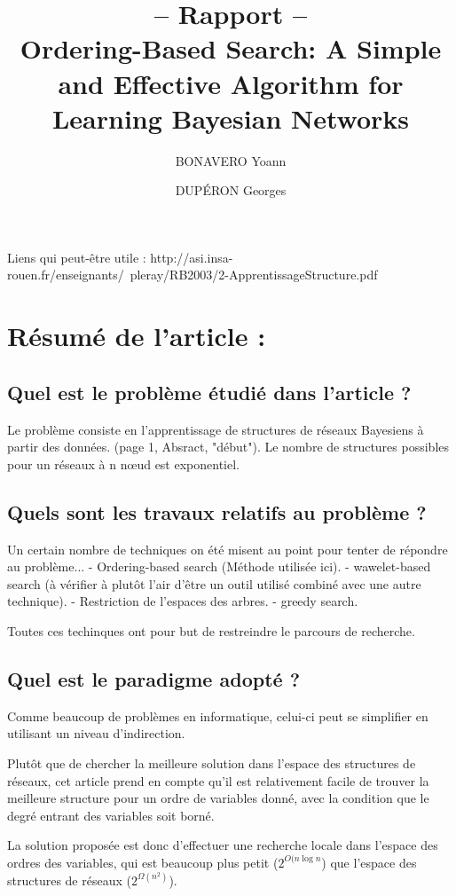 \documentclass[french,a4paper]{article}
\title{-- Rapport -- \\ Ordering-Based Search: A Simple and Effective Algorithm for Learning Bayesian Networks}
\author{BONAVERO Yoann \and DUPÉRON Georges}
\begin{document}
\maketitle
\newpage

Liens qui peut-être utile : 
http://asi.insa-rouen.fr/enseignants/~pleray/RB2003/2-ApprentissageStructure.pdf

\section{Résumé de l’article :}
\subsection{Quel est le problème étudié dans l’article ?}
Le problème consiste en l'apprentissage de structures de réseaux Bayesiens à partir des données.
(page 1, Absract, "début").
Le nombre de structures possibles pour un réseaux à n nœud est exponentiel.
\subsection{Quels sont les travaux relatifs au problème ? }
Un certain nombre de techniques on été misent au point pour tenter de répondre au problème...
- Ordering-based search (Méthode utilisée ici).
- wawelet-based search (à vérifier à plutôt l'air d'être un outil utilisé combiné avec une autre technique).
- Restriction de l'espaces des arbres.
- greedy search.

Toutes ces techinques ont pour but de restreindre le parcours de recherche.

\subsection{Quel est le paradigme adopté ?}
Comme beaucoup de problèmes en informatique, celui-ci peut se
simplifier en utilisant un niveau d'indirection.

Plutôt que de chercher la meilleure solution dans l'espace des
structures de réseaux, cet article prend en compte qu'il est
relativement facile de trouver la meilleure structure pour un ordre de
variables donné, avec la condition que le degré entrant des variables
soit borné.

La solution proposée est donc d'effectuer une recherche locale dans
l'espace des ordres des variables, qui est beaucoup plus petit
($2^{O(n \log n}$) que l'espace des structures de réseaux ($2^{\Omega(n^2)}$).
\end{document}
